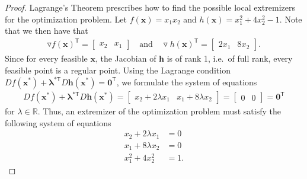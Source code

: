 \documentclass[12pt]{article}
\theoremstyle{definition}
\newcommand{\vc}[1]{\boldsymbol{#1}}
\newcommand{\tran}{\mathsf{T}}
\begin{document}
\begin{proof}
  Lagrange's Theorem prescribes how to find the possible local extremizers for the optimization problem. Let $f(\vc{x}) = x_1x_2$
  and $h(\vc{x}) = x_1^2 + 4x_2^2 - 1$.
  Note that we then have that
  \begin{align*}
    \triangledown f(\vc{x})^\tran =
    \begin{bmatrix}
      x_2 &
      x_1
    \end{bmatrix}
    \quad \text{and} \quad
    \triangledown h(\vc{x})^\tran =
    \begin{bmatrix}
      2x_1 &
      8x_2
    \end{bmatrix}.
  \end{align*}
  Since for every feasible $\vc{x}$, the Jacobian of $\vc{h}$ is of rank 1, i.e.\ of full rank,
  every feasible point is a regular point. Using the Lagrange condition
  $D f(\vc{x}^*) + \vc{\lambda}^{*\tran} D \vc{h}(\vc{x}^*) = \vc{0}^\tran$, we formulate
  the system of equations
  \begin{align*}
    D f(\vc{x}^*) + \vc{\lambda}^{*\tran} D \vc{h}(\vc{x}^*) =
    \begin{bmatrix}x_2 + 2\lambda x_1 & x_1 + 8\lambda x_2\end{bmatrix} =
    \begin{bmatrix}0 & 0\end{bmatrix} = \vc{0}^\tran
  \end{align*}
  for $\lambda \in \mathbb{R}.$
  Thus, an extremizer of the optimization problem must satisfy the following system of equations
  \begin{align*}
    x_2 + 2\lambda x_1 &= 0 \\
    x_1 + 8 \lambda x_2 &= 0 \\
    x_1^2 + 4x_2^2  &=1.
  \end{align*}


\end{proof}
\end{document}
